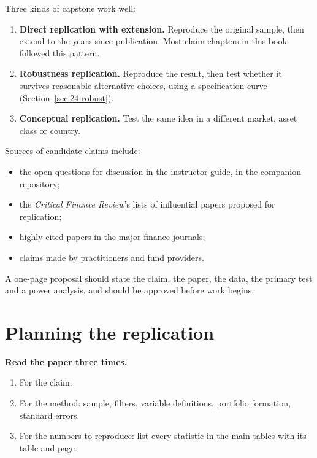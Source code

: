 Three kinds of capstone work well:

\begin{enumerate}
  \item \textbf{Direct replication with extension.} Reproduce the original sample, then extend to the years since publication. Most claim chapters in this book followed this pattern.
  \item \textbf{Robustness replication.} Reproduce the result, then test whether it survives reasonable alternative choices, using a specification curve (Section~\ref{sec:24-robust}).
  \item \textbf{Conceptual replication.} Test the same idea in a different market, asset class or country.
\end{enumerate}

Sources of candidate claims include:

\begin{itemize}
  \item the open questions for discussion in the instructor guide, in the companion repository;
  \item the \emph{Critical Finance Review}'s lists of influential papers proposed for replication;
  \item highly cited papers in the major finance journals;
  \item claims made by practitioners and fund providers.
\end{itemize}

A one-page proposal should state the claim, the paper, the data, the primary test and a power analysis, and should be approved before work begins.

\section{Planning the replication}
\label{sec:24-planning}

\textbf{Read the paper three times.}

\begin{enumerate}
  \item For the claim.
  \item For the method: sample, filters, variable definitions, portfolio formation, standard errors.
  \item For the numbers to reproduce: list every statistic in the main tables with its table and page.
\end{enumerate}

